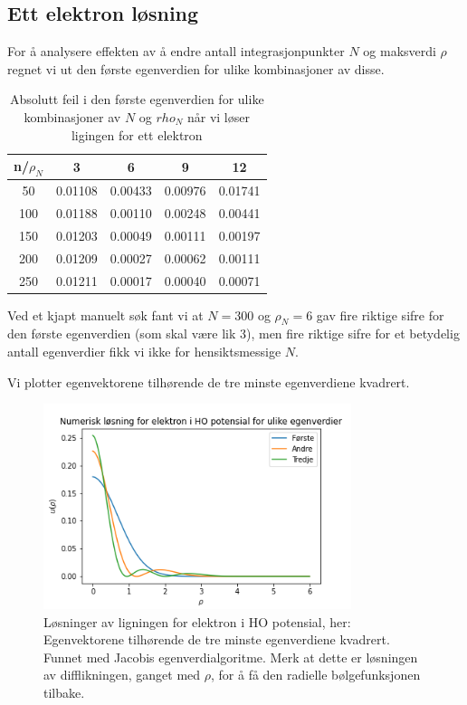 \documentclass[reprint,english,notitlepage]{revtex4-1}
\begin{document}
\subsection{Ett elektron løsning}
	For å analysere effekten av å endre antall integrasjonpunkter $N$ og maksverdi $\rho$ regnet vi ut den første egenverdien for ulike kombinasjoner av disse.
	\begin{table}[H]
		\begin{center}
			\caption{Absolutt feil i den første egenverdien for ulike kombinasjoner av $N$ og $rho_N$ når vi løser ligingen for ett elektron}
			\label{tab:rhoN}
			\begin{tabular}{|c|c|c|c|c|} \hline
				\textbf{n/$\rho_N$} & \textbf{3} & \textbf{6} & \textbf{9} & \textbf{12} \\ \hline
				50 & 0.01108 & 0.00433 & 0.00976 & 0.01741\\
				100 & 0.01188 & 0.00110 & 0.00248 & 0.00441\\
				150 & 0.01203 & 0.00049 & 0.00111 & 0.00197\\
				200 & 0.01209 & 0.00027 & 0.00062 & 0.00111\\
				250 & 0.01211 & 0.00017 & 0.00040 & 0.00071\\ \hline
			\end{tabular}
		\end{center}
	\end{table}

	Ved et kjapt manuelt søk fant vi at $N = 300$ og $\rho_N = 6$ gav fire riktige sifre for den første egenverdien (som skal være lik 3), men fire riktige sifre for et betydelig antall egenverdier fikk vi ikke for hensiktsmessige $N$.
	
	Vi plotter egenvektorene tilhørende de tre minste egenverdiene kvadrert.
	\begin{figure}[H]
		\includegraphics[width=90mm]{../Figures/ettElektron.png}
		\caption{Løsninger av ligningen for elektron i HO potensial, her: Egenvektorene tilhørende de tre minste egenverdiene kvadrert. Funnet med Jacobis egenverdialgoritme. Merk at dette er løsningen av difflikningen, ganget med $\rho$, for å få den radielle bølgefunksjonen tilbake.}
		\label{fig:ettelektron}
	\end{figure}
\end{document}

